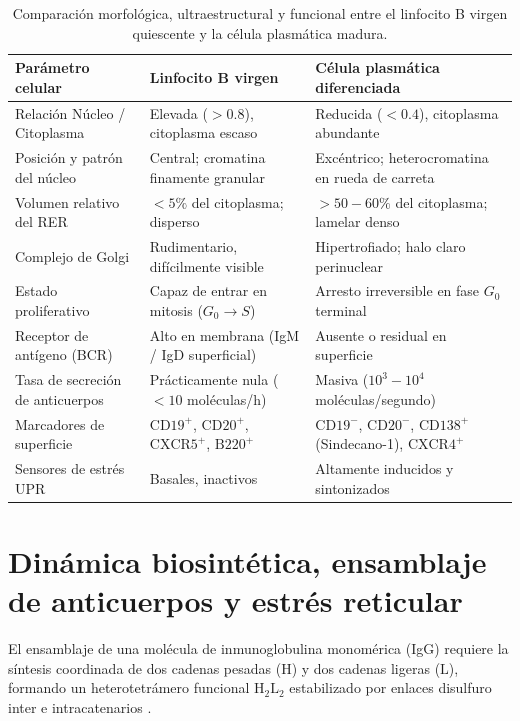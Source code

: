\begin{table}[t]
\centering
\caption{Comparación morfológica, ultraestructural y funcional entre el linfocito B virgen quiescente y la célula plasmática madura.}
\label{tab:comparacion_b_plasma}
\small
\begin{tabularx}{\textwidth}{p{4.2cm}YY}
\toprule
\textbf{Parámetro celular} & \textbf{Linfocito B virgen} & \textbf{Célula plasmática diferenciada} \\
\midrule
Relación Núcleo / Citoplasma & Elevada ($>0.8$), citoplasma escaso & Reducida ($<0.4$), citoplasma abundante \\
Posición y patrón del núcleo & Central; cromatina finamente granular & Excéntrico; heterocromatina en rueda de carreta \\
Volumen relativo del RER & $< 5\%$ del citoplasma; disperso & $> 50-60\%$ del citoplasma; lamelar denso \\
Complejo de Golgi & Rudimentario, difícilmente visible & Hipertrofiado; halo claro perinuclear \\
Estado proliferativo & Capaz de entrar en mitosis ($G_0 \to S$) & Arresto irreversible en fase $G_0$ terminal \\
Receptor de antígeno (BCR) & Alto en membrana (IgM / IgD superficial) & Ausente o residual en superficie \\
Tasa de secreción de anticuerpos & Prácticamente nula ($< 10$ moléculas/h) & Masiva ($10^3 - 10^4$ moléculas/segundo) \\
Marcadores de superficie & $\text{CD19}^+$, $\text{CD20}^+$, $\text{CXCR5}^+$, $\text{B220}^+$ & $\text{CD19}^-$, $\text{CD20}^-$, $\text{CD138}^+$ (Sindecano-1), $\text{CXCR4}^+$ \\
Sensores de estrés UPR & Basales, inactivos & Altamente inducidos y sintonizados \\
\bottomrule
\end{tabularx}
\end{table}

\section{Dinámica biosintética, ensamblaje de anticuerpos y estrés reticular}

El ensamblaje de una molécula de inmunoglobulina monomérica (IgG) requiere la síntesis coordinada de dos cadenas pesadas ($\text{H}$) y dos cadenas ligeras ($\text{L}$), formando un heterotetrámero funcional $\text{H}_2\text{L}_2$ estabilizado por enlaces disulfuro inter e intracatenarios \parencite{walter2011unfolded}.

